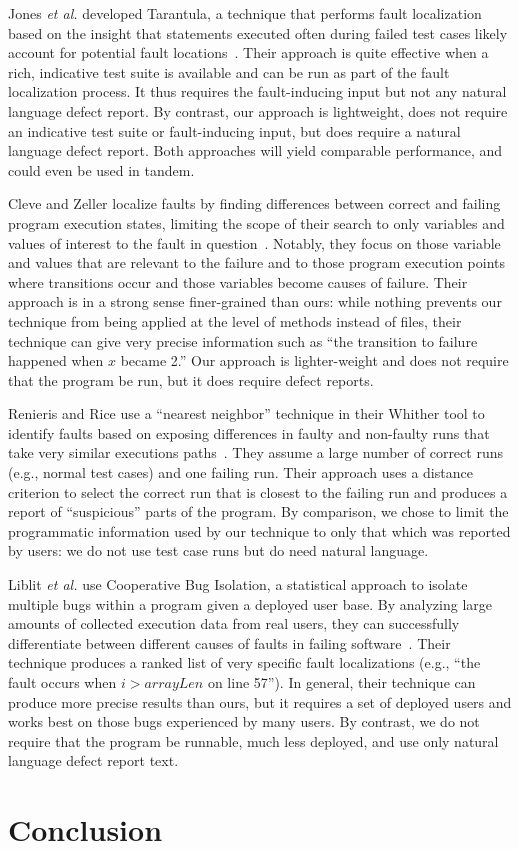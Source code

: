 \documentclass[conference]{IEEEtran}
\begin{document}
Jones \textit{et al.} developed Tarantula, a technique that performs
fault localization based on the insight that statements executed often
during failed test cases likely account for potential fault
locations~\cite{harrold05}. Their approach is quite effective when
a rich, indicative test suite is available and can be run as part of
the fault localization process. It thus requires the fault-inducing
input but not any natural language defect report. By contrast,
our approach is lightweight, does not require an indicative test
suite or fault-inducing input, but does require a natural language
defect report. Both approaches will yield comparable performance, and
could even be used in tandem.

Cleve and Zeller localize faults by finding differences between
correct and failing program execution states, limiting the scope of
their search to only variables and values of interest to the fault in
question~\cite{cleve05}. Notably, they focus on those variable and
values that are relevant to the failure and to those program execution
points where transitions occur and those variables become causes of
failure. Their approach is in a strong sense finer-grained than ours:
while nothing prevents our technique from being applied at the level
of methods instead of files, their technique can give very precise
information such as ``the transition to failure happened when $x$
became 2.'' Our approach is lighter-weight and does not require
that the program be run, but it does require defect reports.

Renieris and Rice use a ``nearest neighbor'' technique in their
Whither tool to identify faults based on exposing differences in
faulty and non-faulty runs that take very similar executions
paths~\cite{Renieris03}. They assume a large number of correct runs
(e.g., normal test cases) and one failing run. Their approach uses a
distance criterion to select the correct run that is closest to the
failing run and produces a report of ``suspicious'' parts of the
program. By comparison, we chose to limit the programmatic information
used by our technique to only that which was reported by users: we
do not use test case runs but do need natural language.

Liblit \textit{et al.} use Cooperative Bug Isolation, a statistical
approach to isolate multiple bugs within a program given a deployed user
base. By analyzing large amounts of collected execution data from real
users, they can successfully differentiate between different causes of
faults in failing software~\cite{liblit05}. Their technique produces
a ranked list of very specific fault localizations (e.g., ``the fault
occurs when $i > arrayLen$ on line 57''). In general, their technique
can produce more precise results than ours, but it requires a set of
deployed users and works best on those bugs experienced by many users.
By contrast, we do not require that the program be runnable, much less
deployed, and use only natural language defect report text.

\section{Conclusion}



\end{document}
